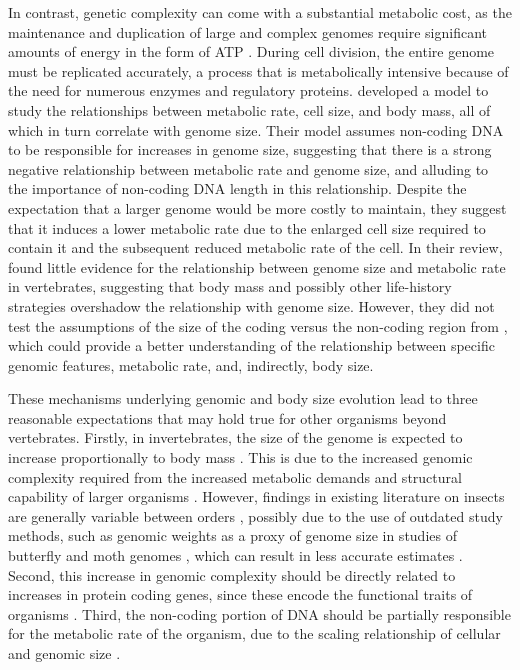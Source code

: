 \documentclass[11pt]{article}
\begin{document}
In contrast, genetic complexity can come with a substantial metabolic cost, as the maintenance and duplication of large and complex genomes require significant amounts of energy in the form of ATP \citep{genomeenergetics}. During cell division, the entire genome must be replicated accurately, a process that is metabolically intensive because of the need for numerous enzymes and regulatory proteins. \cite{Kozlowski} developed a model to study the relationships between metabolic rate, cell size, and body mass, all of which in turn correlate with genome size. Their model assumes non-coding DNA to be responsible for increases in genome size, suggesting that there is a strong negative relationship between metabolic rate and genome size, and alluding to the importance of non-coding DNA length in this relationship. Despite the expectation that a larger genome would be more costly to maintain, they suggest that it induces a lower metabolic rate due to the enlarged cell size required to contain it and the subsequent reduced metabolic rate of the cell. In their review, \cite{genomeandmetabolism} found little evidence for the relationship between genome size and metabolic rate in vertebrates, suggesting that body mass and possibly other life-history strategies overshadow the relationship with genome size. However, they did not test the assumptions of the size of the coding versus the non-coding region from \cite{Kozlowski}, which could provide a better understanding of the relationship between specific genomic features, metabolic rate, and, indirectly, body size.

These mechanisms underlying genomic and body size evolution lead to three reasonable expectations that may hold true for other organisms beyond vertebrates. Firstly, in invertebrates, the size of the genome is expected to increase proportionally to body mass \citep{propagule}. This is due to the increased genomic complexity required from the increased metabolic demands and structural capability of larger organisms \citep{system-scaling, prok-to-human-complexity}. However, findings in existing literature on insects are generally variable between orders \citep{propagule}, possibly due to the use of outdated study methods, such as genomic weights as a proxy of genome size in studies of butterfly and moth genomes \citep{lep-genomes1, lep-genomes2}, which can result in less accurate estimates \citep{wgs}. Second, this increase in genomic complexity should be directly related to increases in protein coding genes, since these encode the functional traits of organisms \citep{protein-function}. Third, the non-coding portion of DNA should be partially responsible for the metabolic rate of the organism, due to the scaling relationship of cellular and genomic size \citep{Kozlowski}. 
\end{document}
